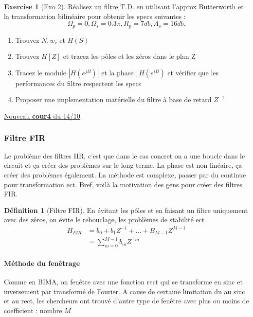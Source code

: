 \documentclass{article}
\theoremstyle{plain}%
\theoremstyle{definition}
\newtheorem{defn}{Définition}[section]
\newtheorem{xca}[exmp]{Exercise}
\theoremstyle{remark}
\begin{document}
\begin{xca}[Exo 2]
    Réalisez un filtre T.D. en utilisant l'approx Butterworth et la transformation bilinéaire pour obtenir les specs suivantes : 
    \[
        \Omega _p = 0, \Omega _s = 0.3 \pi, R_p = 7db, A_s = 16 db
    .\]
    \begin{enumerate}
        \item Trouvez $ N, w_c $ et $ H(S) $ 
        \item Trouvez $ H[Z] $ et tracez les pôles et les zéros dans le plan Z
        \item Tracez le module $ \left| H(e^{j \Omega }) \right| $ et la phase $ \lfloor H(e^{i \Omega }) $ et vérifier que les performances du filtre respectent les specs
        \item Proposer une implementation matérielle du filtre à base de retard $ Z^{-1} $ 
    \end{enumerate}
\end{xca}

\underline{Nouveau \textbf{cour4} du 14/10} \\

\subsubsection{Filtre FIR}
Le problème des filtres IIR, c'est que dans le cas concret on a une boucle dans le circuit et ça créer des problèmes sur le long terme. La phase est non linéaire, ça créer des problèmes également. La méthode est complexe, passer par du continue pour transformation ect. Bref, voilà la motivation des gens pour créer des filtres FIR. 

\begin{defn}[Filtre FIR]
    En évitant les pôles et en faisant un filtre uniquement avec des zéros, on évite le rebouclage, les problèmes de stabilité ect
    \begin{align*}
        H_{FIR} &= b_0 + b_1 Z^{-1} + \dots + B_{M-1}Z^{M-1} \\
                &= \sum_{m=0}^{M-1}b_m Z^{-m}
    \end{align*}
\end{defn}

\paragraph*{Méthode du fenêtrage}
Comme en BIMA, on fenêtre avec une fonction rect qui se transforme en sinc et inversement par transformé de Fourier. A cause de certaine limitation du au sinc et au rect, les chercheurs ont trouvé d'autre type de fenêtre avec plus ou moins de coefficient : nombre $ M $ 
\end{document}
